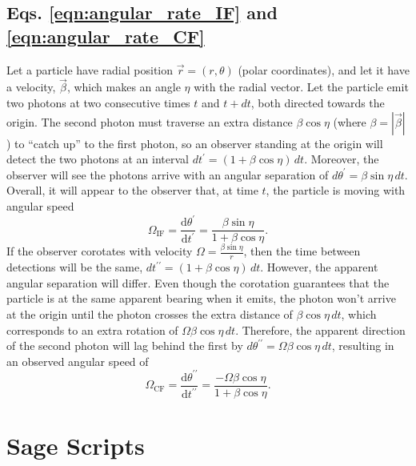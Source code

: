 \documentclass{book}
\newcommand{\deriv}[2]{\frac{\text{d}{#1}}{\text{d}{#2}}}
\begin{document}
\section{Eqs. \eqref{eqn:angular_rate_IF} and \eqref{eqn:angular_rate_CF}}

Let a particle have radial position $\vec{r} = (r,\theta)$ (polar coordinates), and let it have a velocity, $\vec{\beta}$, which makes an angle $\eta$ with the radial vector.
Let the particle emit two photons at two consecutive times $t$ and $t+dt$, both directed towards the origin.
The second photon must traverse an extra distance $\beta\cos\eta$ (where $\beta = |\vec{\beta}|$) to ``catch up'' to the first photon, so an observer standing at the origin will detect the two photons at an interval $dt^\prime = (1+\beta\cos\eta)\,dt$.
Moreover, the observer will see the photons arrive with an angular separation of $d\theta^\prime = \beta\sin\eta\,dt$.
Overall, it will appear to the observer that, at time $t$, the particle is moving with angular speed
\begin{equation}
    \Omega_\text{IF}
        = \deriv{\theta^\prime}{t^\prime}
        = \frac{\beta\sin\eta}{1 + \beta\cos\eta}.
\end{equation}
If the observer corotates with velocity $\Omega = \frac{\beta\sin\eta}{r}$, then the time between detections will be the same, $dt^{\prime\prime} = (1+\beta\cos\eta)\,dt$.
However, the apparent angular separation will differ.
Even though the corotation guarantees that the particle is at the same apparent bearing when it emits, the photon won't arrive at the origin until the photon crosses the extra distance of $\beta\cos\eta\,dt$, which corresponds to an extra rotation of $\Omega\beta\cos\eta\,dt$.
Therefore, the apparent direction of the second photon will lag behind the first by $d\theta^{\prime\prime} = \Omega\beta\cos\eta\,dt$, resulting in an observed angular speed of
\begin{equation}
    \Omega_\text{CF}
        = \deriv{\theta^{\prime\prime}}{t^{\prime\prime}}
        = \frac{-\Omega\beta\cos\eta}{1+\beta\cos\eta}.
\end{equation}

\newpage
\chapter{Sage Scripts}

\newcommand{\lstsage}[2]{\subsection*{#1}\label{sage:#2}}
\end{document}
